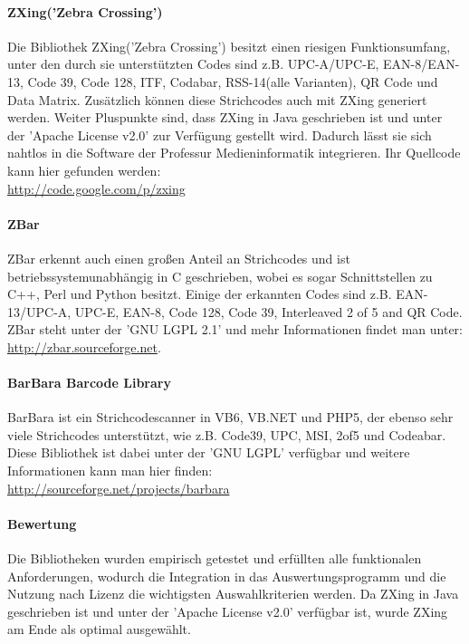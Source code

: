 \paragraph*{ZXing('Zebra Crossing')}
\label{par:zxing}
Die Bibliothek ZXing('Zebra Crossing') besitzt einen riesigen Funktionsumfang, unter den durch sie unterstützten Codes sind z.B. UPC-A/UPC-E, EAN-8/EAN-13, Code 39, Code 128, ITF, Codabar, RSS-14(alle Varianten), QR Code und Data Matrix. Zusätzlich können diese Strichcodes auch mit ZXing generiert werden. Weiter Pluspunkte sind, dass ZXing in Java geschrieben ist und unter der 'Apache License v2.0' zur Verfügung gestellt wird. Dadurch lässt sie sich nahtlos in die Software der Professur Medieninformatik integrieren. Ihr Quellcode kann hier gefunden werden:\\
\url{http://code.google.com/p/zxing}

\paragraph*{ZBar}
ZBar erkennt auch einen großen Anteil an Strichcodes und ist betriebssystemunabhängig in C geschrieben, wobei es sogar Schnittstellen zu C++, Perl und Python besitzt. Einige der erkannten Codes sind z.B. EAN-13/UPC-A, UPC-E, EAN-8, Code 128, Code 39, Interleaved 2 of 5 and QR Code. ZBar steht unter der 'GNU LGPL 2.1' und mehr Informationen findet man unter:\\
\url{http://zbar.sourceforge.net}.

\paragraph*{BarBara Barcode Library}
BarBara ist ein Strichcodescanner in VB6, VB.NET und PHP5, der ebenso sehr viele Strichcodes unterstützt, wie z.B. Code39, UPC, MSI, 2of5 und Codeabar. Diese Bibliothek ist dabei unter der 'GNU LGPL' verfügbar und weitere Informationen kann man hier finden:\\
\url{http://sourceforge.net/projects/barbara}

\paragraph*{Bewertung}
Die Bibliotheken wurden empirisch getestet und erfüllten alle funktionalen Anforderungen, wodurch die Integration in das Auswertungsprogramm und die Nutzung nach Lizenz die wichtigsten Auswahlkriterien werden. Da ZXing in Java geschrieben ist und unter der 'Apache License v2.0' verfügbar ist, wurde ZXing am Ende als optimal ausgewählt.
